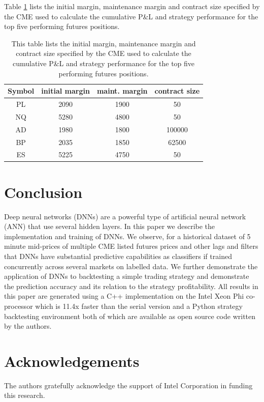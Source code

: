 \documentclass{article}
\begin{document}
\vspace{30pt}

Table \ref{tab:margin} lists the initial margin, maintenance margin and contract size specified by the CME used to calculate the cumulative P\&L and strategy performance for the top five performing futures positions.


\begin{table}[H]
\begin{center}
\begin{tabular}{|c|c|c|c|}
\hline
Symbol &	initial margin &	maint. margin & contract size\\
\hline
PL	& 2090	&1900	&50\\
NQ	 & 5280	& 4800	& 50\\
AD	& 1980 &	1800	&100000\\
BP&	2035	 & 1850 &	62500\\
ES&	5225	& 4750&	50\\
\hline
\end{tabular}
\end{center}
\caption{This table lists the initial margin, maintenance margin and contract size specified by the CME  used to calculate the cumulative P\&L and strategy performance for the top five performing futures positions.}
\label{tab:margin}
\end{table}



\section{Conclusion}
Deep neural networks (DNNs) are a powerful type of artificial neural network (ANN) that use several hidden layers. In this paper we describe the implementation and training of DNNs. We observe, for a historical dataset of 5 minute
mid-prices of multiple CME listed futures prices and other lags and filters that DNNs have substantial predictive capabilities as classifiers if trained concurrently across several markets on labelled data.  We further demonstrate the application of DNNs to backtesting a simple trading strategy and demonstrate the prediction accuracy and its relation to the strategy profitability. All results in this paper are generated using a C++ implementation on the Intel Xeon Phi co-processor which is 11.4x faster than the serial version and a Python strategy backtesting environment both of which are available as open source code written by the authors.

\section{Acknowledgements} The authors gratefully acknowledge the support of Intel
Corporation in funding this research.

\clearpage

 
\end{document}
